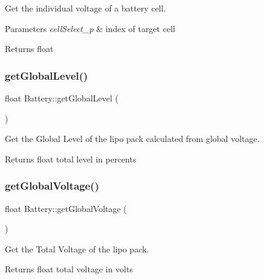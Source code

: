 Get the individual voltage of a battery cell. 


\begin{DoxyParams}{Parameters}
{\em cell\+Select\+\_\+p} & index of target cell \\
\hline
\end{DoxyParams}
\begin{DoxyReturn}{Returns}
float 
\end{DoxyReturn}
\mbox{\label{class_battery_a16e5bfb8a07ce93c08382fbcfb0b19be}} 
\subsubsection{\texorpdfstring{get\+Global\+Level()}{getGlobalLevel()}}
{\footnotesize\ttfamily float Battery\+::get\+Global\+Level (\begin{DoxyParamCaption}{ }\end{DoxyParamCaption})}



Get the Global Level of the lipo pack calculated from global voltage. 

\begin{DoxyReturn}{Returns}
float total level in percents 
\end{DoxyReturn}
\mbox{\label{class_battery_a288d5d3b5ebbe964751a9d64519aacdb}} 
\subsubsection{\texorpdfstring{get\+Global\+Voltage()}{getGlobalVoltage()}}
{\footnotesize\ttfamily float Battery\+::get\+Global\+Voltage (\begin{DoxyParamCaption}{ }\end{DoxyParamCaption})}



Get the Total Voltage of the lipo pack. 

\begin{DoxyReturn}{Returns}
float total voltage in volts 
\end{DoxyReturn}
\mbox{\label{class_battery_aed541975df2c26475cbc0c37a9ddf659}} 
